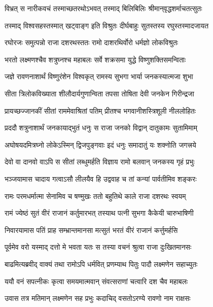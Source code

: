 \twolineshloka
{विभ्रत् स नारीकवचं तस्माच्छतरथोऽभवत्}
{तस्माद् बिलिबिलिः श्रीमान्‌वृद्धशर्माचतत्सुतः} %

\twolineshloka
{तस्माद् विश्वसहस्तस्मात् खट्वाङ्ग इति विश्रुतः}
{दीर्घबाहुः सुतस्तस्य रघुस्तस्मादजायत} %

\twolineshloka
{रघोरजः समुत्पन्नो राजा दशरथस्ततः}
{रामो दाशरथिर्वोरो धर्मज्ञो लोकविश्रुतः} %

\twolineshloka
{भरतो लक्ष्मणश्चैव शत्रुघ्नश्च महाबलः}
{सर्वे शक्रसमा युद्धे विष्णुशक्तिसमन्विताः} %

\twolineshloka
{जज्ञे रावणनाशार्थं विष्णुरंशेन विश्वकृत्}
{रामस्य सुभगा भार्या जनकस्यात्मजा शुभा} %

\twolineshloka
{सीता त्रिलोकविख्याता शीलौदार्यगुणान्विता}
{तपसा तोषिता देवी जनकेन गिरीन्द्रजा} %

\twolineshloka
{प्रायच्छज्जानकीं सीतां राममेवाश्रितां पतिम्}
{प्रीतश्च भगवानीशस्त्रिशूली नीललोहितः} %

\twolineshloka
{प्रददौ शत्रुनाशार्थं जनकायाद्‌भुतं धनुः}
{स राजा जनको विद्वान् दातुकामः सुतामिमाम्} %

\twolineshloka
{अघोषयदमित्रघ्नो लोकेऽस्मिन् द्विजपुङ्गवाः}
{इदं धनुः समादातुं यः शक्नोति जगत्त्रये} %

\twolineshloka
{देवो वा दानवो वाऽपि स सीतां लब्धुमर्हति}
{विज्ञाय रामो बलवान् जनकस्य गृहं प्रभुः} %

\twolineshloka
{भञ्जयामास चादाय गत्वाऽसौ लीलयैव हि}
{उद्ववाह च तां कन्यां पार्वतीमिव शङ्करः} %

\twolineshloka
{रामः परमधर्मात्मा सेनामिव च षण्मुखः}
{ततो बहुतिथे काले राजा दशरथः स्वयम्} %

\twolineshloka
{रामं ज्येष्ठं सुतं वीरं राजानं कर्तुमारभत्}
{तस्याथ पत्नी सुभगा कैकेयी चारुभाषिणी} %

\twolineshloka
{निवारयामास पतिं प्राह सम्भ्रान्तमानसा}
{मत्सुतं भरतं वीरं राजानं कर्त्तुमर्हसि} %

\twolineshloka
{पूर्वमेव वरो यस्माद् दत्तो मे भवता यतः}
{स तस्या वचनं श्रुत्वा राजा दुःखितमानसः} %

\twolineshloka
{बाढमित्यब्रवीद् वाक्यं तथा रामोऽपि धर्मवित्}
{प्रणम्याथ पितुः पादौ लक्ष्मणेन सहाच्युतः} %

\twolineshloka
{ययौ वनं सपत्नीकः कृत्वा समयमात्मवान्}
{संवत्सराणां चत्वारि दश चैव महाबलः} %

\twolineshloka
{उवास तत्र मतिमान् लक्ष्मणेन सह प्रभुः}
{कदाचिद् वसतोऽरण्ये रावणो नाम राक्षसः} %

